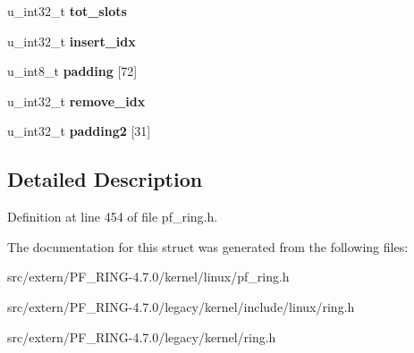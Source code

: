\begin{DoxyCompactItemize}
\item 
\hypertarget{structflow_slot_info_a571cb1645b5cd0038363dc60198a9f90}{
u\_\-int32\_\-t {\bfseries tot\_\-slots}}
\label{structflow_slot_info_a571cb1645b5cd0038363dc60198a9f90}

\item 
\hypertarget{structflow_slot_info_a74c06ddae50a7b0f321faaee4f98150f}{
u\_\-int32\_\-t {\bfseries insert\_\-idx}}
\label{structflow_slot_info_a74c06ddae50a7b0f321faaee4f98150f}

\item 
\hypertarget{structflow_slot_info_aefad5ac7b7bc7c104ece6dd33081ee3e}{
u\_\-int8\_\-t {\bfseries padding} \mbox{[}72\mbox{]}}
\label{structflow_slot_info_aefad5ac7b7bc7c104ece6dd33081ee3e}

\item 
\hypertarget{structflow_slot_info_a295467b038172aaad1f1037fa3bee65c}{
u\_\-int32\_\-t {\bfseries remove\_\-idx}}
\label{structflow_slot_info_a295467b038172aaad1f1037fa3bee65c}

\item 
\hypertarget{structflow_slot_info_ab49bd3eba2044dfd131bbcc7c0ce0cba}{
u\_\-int32\_\-t {\bfseries padding2} \mbox{[}31\mbox{]}}
\label{structflow_slot_info_ab49bd3eba2044dfd131bbcc7c0ce0cba}

\end{DoxyCompactItemize}


\subsection{Detailed Description}


Definition at line 454 of file pf\_\-ring.h.



The documentation for this struct was generated from the following files:\begin{DoxyCompactItemize}
\item 
src/extern/PF\_\-RING-\/4.7.0/kernel/linux/pf\_\-ring.h\item 
src/extern/PF\_\-RING-\/4.7.0/legacy/kernel/include/linux/ring.h\item 
src/extern/PF\_\-RING-\/4.7.0/legacy/kernel/ring.h\end{DoxyCompactItemize}
